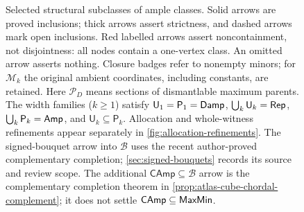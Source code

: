 \begin{figure}[p]
{}
\caption{Selected structural subclasses of ample classes. Solid arrows are
proved inclusions; thick arrows assert strictness, and dashed arrows mark
open inclusions. Red labelled arrows assert noncontainment, not disjointness:
all nodes contain a one-vertex class. An omitted arrow asserts nothing.
Closure badges refer to nonempty minors; for $\mathcal M_k$ the original
ambient coordinates, including constants, are retained.
Here $\mathcal P_D$ means sections of dismantlable maximum parents.
The width families ($k\ge1$) satisfy $\mathsf U_1=\mathsf P_1=\mathsf{Damp}$,
$\bigcup_k\mathsf U_k=\mathsf{Rep}$, $\bigcup_k\mathsf P_k=\mathsf{Amp}$, and
$\mathsf U_k\subseteq\mathsf P_k$.
Allocation and whole-witness refinements appear separately in
\cref{fig:allocation-refinements}. The signed-bouquet arrow into
$\mathcal B$ uses the recent author-proved complementary completion;
\cref{sec:signed-bouquets} records its source and review scope.
The additional $\mathsf{CAmp}\subseteq\mathcal B$ arrow is the
complementary completion theorem in
\cref{prop:atlas-cube-chordal-complement}; it does not settle
$\mathsf{CAmp}\subseteq\mathsf{MaxMin}$.}
\label{fig:classes}
\end{figure}
